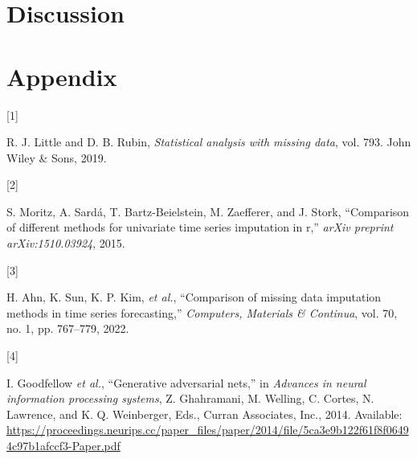 \documentclass[
]{report}
\newlength{\cslhangindent}
\newlength{\csllabelwidth}
\newenvironment{CSLReferences}[2] %
 {\begin{list}{}{%
  \setlength{\itemindent}{0pt}
  \setlength{\leftmargin}{0pt}
  \setlength{\parsep}{0pt}
  \ifodd #1
   \setlength{\leftmargin}{\cslhangindent}
   \setlength{\itemindent}{-1\cslhangindent}
  \fi
  \setlength{\itemsep}{#2\baselineskip}}}
 {\end{list}}
\newcommand{\CSLLeftMargin}[1]{\parbox[t]{\csllabelwidth}{\strut#1\strut}}
\newcommand{\CSLRightInline}[1]{\parbox[t]{\linewidth - \csllabelwidth}{\strut#1\strut}}
\begin{document}
\chapter{Discussion}\label{discussion}

\printbibliography

\chapter*{Appendix}\label{appendix}

\label{refs}
\begin{CSLReferences}{0}{0}
\CSLLeftMargin{{[}1{]} }%
\CSLRightInline{R. J. Little and D. B. Rubin, \emph{Statistical analysis
with missing data}, vol. 793. John Wiley \& Sons, 2019.}

\CSLLeftMargin{{[}2{]} }%
\CSLRightInline{S. Moritz, A. Sardá, T. Bartz-Beielstein, M. Zaefferer,
and J. Stork, {``Comparison of different methods for univariate time
series imputation in r,''} \emph{arXiv preprint arXiv:1510.03924},
2015.}

\CSLLeftMargin{{[}3{]} }%
\CSLRightInline{H. Ahn, K. Sun, K. P. Kim, \emph{et al.}, {``Comparison
of missing data imputation methods in time series forecasting,''}
\emph{Computers, Materials \& Continua}, vol. 70, no. 1, pp. 767--779,
2022.}

\CSLLeftMargin{{[}4{]} }%
\CSLRightInline{I. Goodfellow \emph{et al.}, {``Generative adversarial
nets,''} in \emph{Advances in neural information processing systems}, Z.
Ghahramani, M. Welling, C. Cortes, N. Lawrence, and K. Q. Weinberger,
Eds., Curran Associates, Inc., 2014. Available:
\url{https://proceedings.neurips.cc/paper_files/paper/2014/file/5ca3e9b122f61f8f06494c97b1afccf3-Paper.pdf}}

\end{CSLReferences}
\end{document}
